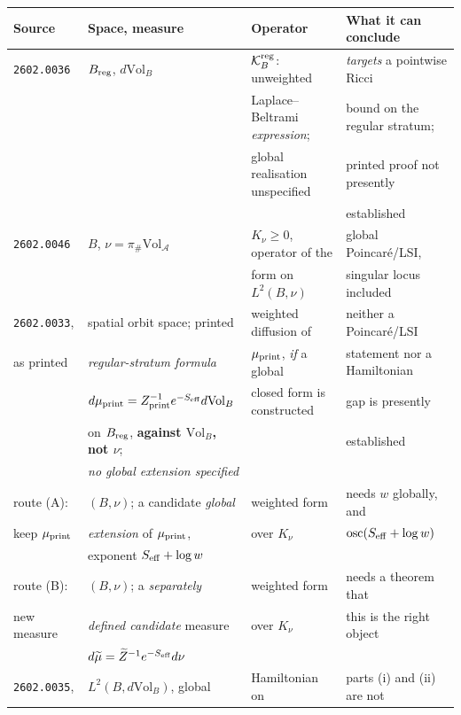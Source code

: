 \documentclass[11pt]{article}
\newcommand{\A}{\mathcal A}
\begin{document}
\begin{center}
\footnotesize
\setlength{\tabcolsep}{4pt}
\begin{tabular}{|l|l|l|l|}
\hline
\textbf{Source} & \textbf{Space, measure} & \textbf{Operator} & \textbf{What it can conclude}\\
\hline
\texttt{2602.0036}
 & $B_{\rm reg}$, $d\mathrm{Vol}_B$
 & $\mathcal K_B^{\rm reg}$: unweighted
 & \emph{targets} a pointwise Ricci\\
 & & Laplace--Beltrami \emph{expression};
 & bound on the regular stratum;\\
 & & global realisation unspecified
 & printed proof not presently\\
 & & & established\\
\hline
\texttt{2602.0046}
 & $B$, $\nu=\pi_\#\mathrm{Vol}_{\A}$
 & $K_\nu\ge0$, operator of the
 & global Poincar\'e/LSI,\\
 & & form on $L^2(B,\nu)$ & singular locus included\\
\hline
\texttt{2602.0033},
 & spatial orbit space; printed
 & weighted diffusion of
 & neither a Poincar\'e/LSI\\
as printed
 & \emph{regular-stratum formula}
 & $\mu_{\rm print}$, \emph{if} a global
 & statement nor a Hamiltonian\\
 & $d\mu_{\rm print}=Z_{\rm print}^{-1}e^{-S_{\rm eff}}d\mathrm{Vol}_B$
 & closed form is constructed
 & gap is presently\\
 & on $B_{\rm reg}$, \textbf{against $\mathrm{Vol}_B$, not $\nu$};
 &
 & established\\
 & \emph{no global extension specified} & & \\
\hline
route (A):
 & $(B,\nu)$; a candidate \emph{global}
 & weighted form
 & needs $w$ globally, and\\
keep $\mu_{\rm print}$
 & \emph{extension} of $\mu_{\rm print}$,
 & over $K_\nu$
 & $\operatorname{osc}(S_{\rm eff}+\log w)$\\
 & exponent $S_{\rm eff}+\log w$ & & \\
\hline
route (B):
 & $(B,\nu)$; a \emph{separately}
 & weighted form
 & needs a theorem that\\
new measure
 & \emph{defined candidate} measure
 & over $K_\nu$
 & this is the right object\\
 & $d\widetilde\mu=\widetilde Z^{-1}e^{-S_{\rm eff}}d\nu$ & & \\
\hline
\texttt{2602.0035},
 & $L^2(B,d\mathrm{Vol}_B)$, global
 & Hamiltonian on
 & parts (i) and (ii) are not\\

\end{tabular}
\end{center}
\end{document}
